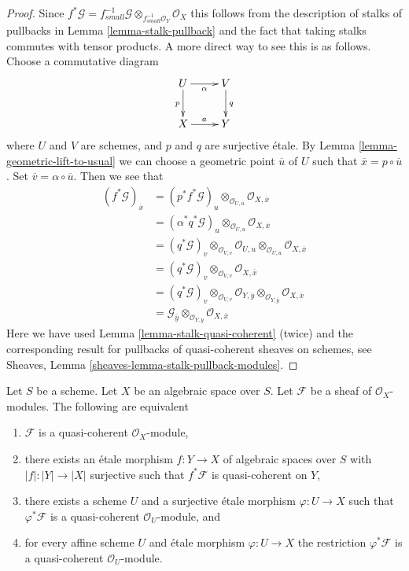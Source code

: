\begin{proof}
Since $f^*\mathcal{G} =
f_{small}^{-1}\mathcal{G} \otimes_{f_{small}^{-1}\mathcal{O}_Y} \mathcal{O}_X$
this follows from the description of stalks of pullbacks in
Lemma \ref{lemma-stalk-pullback}
and the fact that taking stalks commutes with tensor products.
A more direct way to see this is as follows.
Choose a commutative diagram
$$
\xymatrix{
U \ar[d]_p \ar[r]_\alpha  & V \ar[d]^q \\
X \ar[r]^a & Y
}
$$
where $U$ and $V$ are schemes, and $p$ and $q$ are surjective \'etale.
By
Lemma \ref{lemma-geometric-lift-to-usual}
we can choose a geometric point $\overline{u}$ of $U$ such that
$\overline{x} = p \circ \overline{u}$. Set
$\overline{v} = \alpha \circ \overline{u}$.
Then we see that
\begin{align*}
(f^*\mathcal{G})_{\overline{x}} & =
(p^*f^*\mathcal{G})_u \otimes_{\mathcal{O}_{U, u}}
\mathcal{O}_{X, \overline{x}} \\
& = (\alpha^*q^*\mathcal{G})_u \otimes_{\mathcal{O}_{U, u}}
\mathcal{O}_{X, \overline{x}} \\
& = (q^*\mathcal{G})_v \otimes_{\mathcal{O}_{V, v}}
\mathcal{O}_{U, u} \otimes_{\mathcal{O}_{U, u}}
\mathcal{O}_{X, \overline{x}} \\
& = (q^*\mathcal{G})_v \otimes_{\mathcal{O}_{V, v}}
\mathcal{O}_{X, \overline{x}} \\
& = (q^*\mathcal{G})_v \otimes_{\mathcal{O}_{V, v}}
\mathcal{O}_{Y, \overline{y}} \otimes_{\mathcal{O}_{Y, \overline{y}}}
\mathcal{O}_{X, \overline{x}} \\
& = \mathcal{G}_{\overline{y}} \otimes_{\mathcal{O}_{Y, \overline{y}}}
\mathcal{O}_{X, \overline{x}}
\end{align*}
Here we have used
Lemma \ref{lemma-stalk-quasi-coherent} (twice)
and the corresponding result for pullbacks of quasi-coherent sheaves
on schemes, see
Sheaves, Lemma \ref{sheaves-lemma-stalk-pullback-modules}.
\end{proof}

\begin{lemma}
\label{lemma-characterize-quasi-coherent}
Let $S$ be a scheme. Let $X$ be an algebraic space over $S$.
Let $\mathcal{F}$ be a sheaf of $\mathcal{O}_X$-modules.
The following are equivalent
\begin{enumerate}
\item $\mathcal{F}$ is a quasi-coherent $\mathcal{O}_X$-module,
\item there exists an \'etale morphism $f : Y \to X$ of
algebraic spaces over $S$ with $|f| : |Y| \to |X|$ surjective
such that $f^*\mathcal{F}$ is quasi-coherent on $Y$,
\item there exists a scheme $U$ and a surjective \'etale morphism
$\varphi : U \to X$ such that $\varphi^*\mathcal{F}$ is a quasi-coherent
$\mathcal{O}_U$-module, and
\item for every affine scheme $U$ and \'etale morphism $\varphi : U \to X$ the
restriction $\varphi^*\mathcal{F}$ is a quasi-coherent $\mathcal{O}_U$-module.
\end{enumerate}
\end{lemma}

